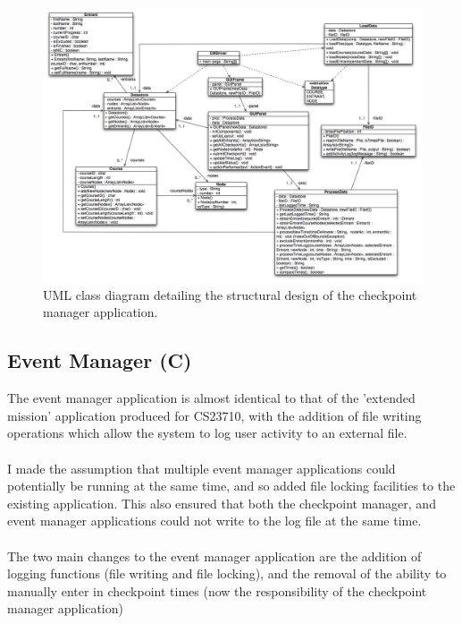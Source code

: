\documentclass[a4paper, 10pt]{article}
\begin{document}
\begin{figure}[ht!]
\centering
\includegraphics[scale=0.38]{checkpoint_manager_class_diagram.jpg}
\caption{UML class diagram detailing the structural design of the checkpoint manager application.}
\end{figure}

\subsection{Event Manager (C)}

The event manager application is almost identical to that of the 'extended mission' application produced for CS23710, with the addition of file writing operations which allow the system to log user activity to an external file. \\\\
I made the assumption that multiple event manager applications could potentially be running at the same time, and so added file locking facilities to the existing application. This also ensured that both the checkpoint manager, and event manager applications could not write to the log file at the same time. \\\\
The two main changes to the event manager application are the addition of logging functions (file writing and file locking), and the removal of the ability to manually enter in checkpoint times (now the responsibility of the checkpoint manager application)


\end{document}
